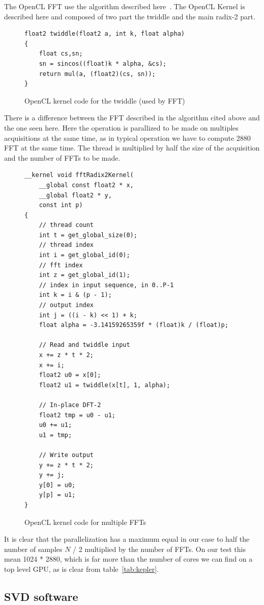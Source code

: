 The \gls{OpenCL} \gls{FFT} use the algorithm described here~\cite{Govindaraju07}. The OpenCL Kernel is described here and composed of two part the twiddle and the main radix-2 part.

\begin{figure}[H]
\centering
\caption{OpenCL kernel code for the twiddle (used by FFT)}
\label{fig:twidle_cl}
\begin{lstlisting}
float2 twiddle(float2 a, int k, float alpha)
{
	float cs,sn;
	sn = sincos((float)k * alpha, &cs);
	return mul(a, (float2)(cs, sn));
}
\end{lstlisting}
\end{figure}

There is a difference between the \gls{FFT} described in the algorithm
cited above and the one seen here. Here the operation is parallized to
be made on multiples acquisitions at the same time, as in typical
operation we have to compute 2880 FFT at the same time. The thread is
multiplied by half the size of the acquisition and the number of
\glspl{FFT} to be made.

\begin{figure}[H]
\centering
\caption{OpenCL kernel code for multiple FFTs}
\label{fig:fft_cl}
\begin{lstlisting}
__kernel void fftRadix2Kernel(
	__global const float2 * x,
	__global float2 * y,
	const int p)
{
	// thread count
	int t = get_global_size(0);
	// thread index
  	int i = get_global_id(0);
	// fft index
  	int z = get_global_id(1);
  	// index in input sequence, in 0..P-1
  	int k = i & (p - 1);
  	// output index
  	int j = ((i - k) << 1) + k;
  	float alpha = -3.14159265359f * (float)k / (float)p;
  	
	// Read and twiddle input
	x += z * t * 2;
	x += i;
	float2 u0 = x[0];
	float2 u1 = twiddle(x[t], 1, alpha);
	
	// In-place DFT-2
	float2 tmp = u0 - u1; 
	u0 += u1; 
	u1 = tmp;
	
	// Write output
	y += z * t * 2;
	y += j;
	y[0] = u0;
	y[p] = u1;
}
\end{lstlisting}
\end{figure}

It is clear that the parallelization has a maximum equal in our case to half the number of samples $N$ / 2 multiplied by the number of \glspl{FFT}. On our test this mean 1024 * 2880, which is far more than the number of cores we can find on a top level \gls{GPU}, as is clear from table~\ref{tab:kepler}.

\subsection{SVD software}

